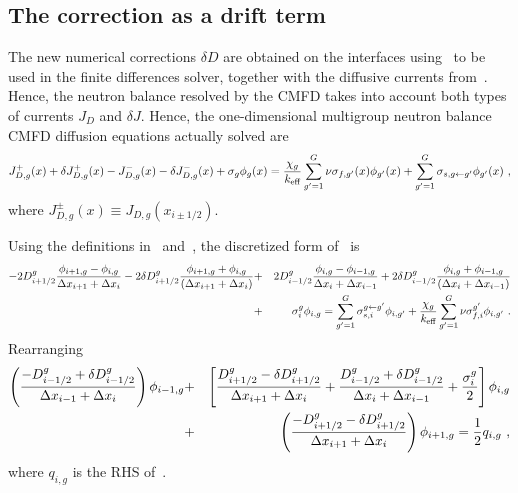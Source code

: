 %
\subsection{The correction as a drift term}
\label{sec:corr-drift}

The new numerical corrections $\delta D$ are obtained on the interfaces using~ to be used in the finite differences solver, together with the diffusive currents from~. Hence, the neutron balance resolved by the CMFD takes into account both types of currents $J_D$ and $\delta J$. %
Hence, the one-dimensional multigroup neutron balance CMFD diffusion equations actually solved are
\begin{equation}\label{eq:diff1}
J_{D,g}^+(x) + \delta J_{D,g}^+(x) -  J_{D,g}^-(x) - \delta J_{D,g}^-(x) + \sigma_{g}\phi_g(x) =  \frac{\chi_g}{{k_{\textrm{\scriptsize{eff}}}}}\sum\limits_{g'=1}^G\nu\sigma_{f,g'}(x)\phi_{g'}(x) + \sum\limits_{g'=1}^G\sigma_{s,g\leftarrow g'}\phi_{g'}(x) \,\, ,
\end{equation}
where $J_{D,g}^\pm (x)\equiv J_{D,g}(x_{i\pm 1/2})$.

Using the definitions in~ and~, the discretized form of~ is
\begin{eqnarray}\label{eq:FD_diff_full}
- 2D_{i+1/2}^g\frac{\phi_{i+1,g}-\phi_{i,g}}{\Delta x_{i+1} + \Delta x_i}
- 2\delta D_{i+1/2}^g\frac{\phi_{i+1,g}+\phi_{i,g}}{(\Delta x_{i+1}+\Delta x_i)}
&+& 2D_{i-1/2}^g\frac{\phi_{i,g}-\phi_{i-1,g}}{\Delta x_{i} + \Delta x_{i-1}}  
+ 2\delta D_{i-1/2}^g\frac{\phi_{i,g}+\phi_{i-1,g}}{(\Delta x_i+\Delta x_{i-1})} 
\nonumber \\
&+& \sigma_{i}^g \phi_{i,g} 
= \sum\limits_{g'=1}^G \sigma_{s,i}^{g\leftarrow g'}\phi_{i,g'}
+ \frac{\chi_g}{{k_{\textrm{\scriptsize{eff}}}}}\sum\limits_{g'=1}^G
 \nu\sigma_{f,i}^{g'}\phi_{i,g'} 
\,\,.
\end{eqnarray}
Rearranging 
\begin{eqnarray}\label{eq:FD_diff_org}
\left(
\frac{-D_{i-1/2}^g + \delta D_{i-1/2}^g }{\Delta x_{i-1}+\Delta x_{i}}
\right)
\phi_{i-1,g}
&+&\left[
\frac{D_{i+1/2}^g - \delta D_{i+1/2}^g}{\Delta x_{i+1}+\Delta x_i}
+\frac{D_{i-1/2}^g + \delta D_{i-1/2}^g}{\Delta x_{i}+\Delta x_{i-1}}
+\frac{\sigma_{i}^g}{2}
\right]
\phi_{i,g}
\nonumber \\
&+&\left(
\frac{-D_{i+1/2}^g -\delta D_{i+1/2}^g }{\Delta x_{i+1}+\Delta x_{i}}
\right)
\phi_{i+1,g} =
\frac{1}{2}q_{i,g}\,\, ,
\end{eqnarray}
where $q_{i,g}$ is the RHS of~.

